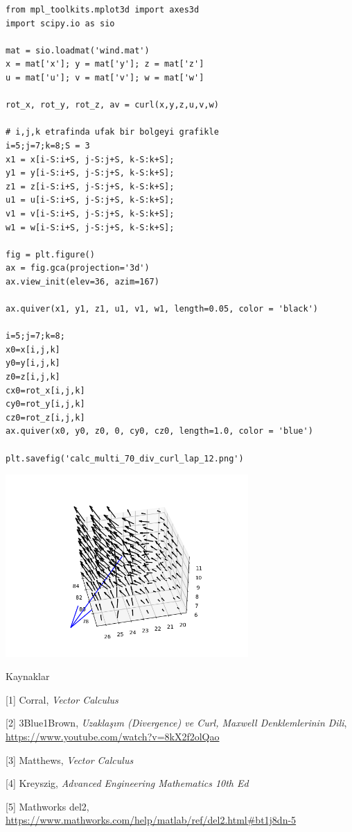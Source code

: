 \documentclass[12pt,fleqn]{article}\usepackage{../../common}
\begin{document}
\begin{verbatim}
from mpl_toolkits.mplot3d import axes3d
import scipy.io as sio

mat = sio.loadmat('wind.mat')
x = mat['x']; y = mat['y']; z = mat['z']
u = mat['u']; v = mat['v']; w = mat['w']

rot_x, rot_y, rot_z, av = curl(x,y,z,u,v,w)

# i,j,k etrafinda ufak bir bolgeyi grafikle
i=5;j=7;k=8;S = 3
x1 = x[i-S:i+S, j-S:j+S, k-S:k+S]; 
y1 = y[i-S:i+S, j-S:j+S, k-S:k+S]; 
z1 = z[i-S:i+S, j-S:j+S, k-S:k+S];
u1 = u[i-S:i+S, j-S:j+S, k-S:k+S]; 
v1 = v[i-S:i+S, j-S:j+S, k-S:k+S]; 
w1 = w[i-S:i+S, j-S:j+S, k-S:k+S];

fig = plt.figure()
ax = fig.gca(projection='3d')
ax.view_init(elev=36, azim=167)

ax.quiver(x1, y1, z1, u1, v1, w1, length=0.05, color = 'black')

i=5;j=7;k=8;
x0=x[i,j,k]
y0=y[i,j,k]
z0=z[i,j,k]
cx0=rot_x[i,j,k]
cy0=rot_y[i,j,k]
cz0=rot_z[i,j,k]
ax.quiver(x0, y0, z0, 0, cy0, cz0, length=1.0, color = 'blue')

plt.savefig('calc_multi_70_div_curl_lap_12.png')
\end{verbatim}

\includegraphics[width=25em]{calc_multi_70_div_curl_lap_12.png}


Kaynaklar 

[1] Corral, {\em Vector Calculus}

[2] 3Blue1Brown, {\em Uzaklaşım (Divergence) ve Curl, Maxwell Denklemlerinin Dili},
    \url{https://www.youtube.com/watch?v=8kX2f2olQao}

[3] Matthews, {\em Vector Calculus}

[4] Kreyszig, {\em Advanced Engineering Mathematics 10th Ed}

[5] Mathworks del2, \url{https://www.mathworks.com/help/matlab/ref/del2.html#bt1j8dn-5}
\end{document}
